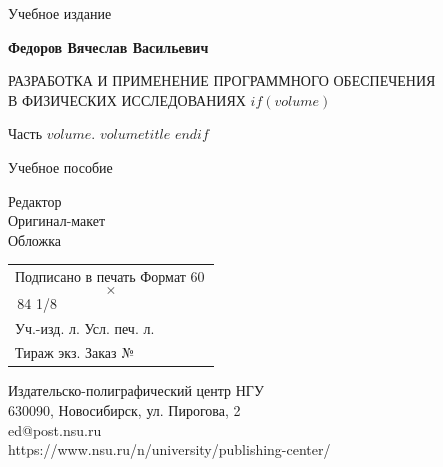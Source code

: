 \documentclass[12pt,oneside]{book}
\begin{document}
\clearpage
\ifodd\value{page}\hbox{}\thispagestyle{empty}\clearpage\fi
\thispagestyle{empty}
\vspace*{\fill}
\begin{center}
{\small
Учебное издание
\vspace{6mm}

\textbf{Федоров Вячеслав Васильевич}
\vspace{4mm}

РАЗРАБОТКА И ПРИМЕНЕНИЕ ПРОГРАММНОГО ОБЕСПЕЧЕНИЯ\\
В ФИЗИЧЕСКИХ ИССЛЕДОВАНИЯХ
$if(volume)$

Часть $volume$. $volumetitle$
$endif$
\vspace{4mm}

Учебное пособие
\vspace{10mm}

Редактор \underline{\hspace{30mm}}\\
Оригинал-макет \underline{\hspace{30mm}}\\
Обложка \underline{\hspace{30mm}}
\vspace{8mm}

\begin{tabular}{@{}l@{}}
Подписано в печать \underline{\hspace{20mm}}\quad Формат 60\,$$\times$$\,84 1/8\\
Уч.-изд. л. \underline{\hspace{12mm}}\quad
Усл. печ. л. \underline{\hspace{12mm}}\\
Тираж \underline{\hspace{12mm}} экз. \quad Заказ № \underline{\hspace{12mm}}\\
\end{tabular}
\vspace{8mm}

Издательско-полиграфический центр НГУ\\
630090, Новосибирск, ул. Пирогова, 2\\
ed@post.nsu.ru\\
https://www.nsu.ru/n/university/publishing-center/
}
\end{center}
\label{LastPage}
\end{document}
